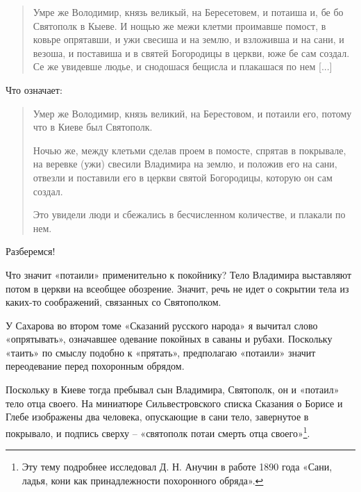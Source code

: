 \begin{quotation}
Умре же Володимир, князь великый, на Бересетовем, и потаиша и, бе бо Святополк в Кыеве. И нощью же межи клетми проимавше помост, в ковьре опрятавши, и ужи свесиша и на землю, и взложивша и на сани, и везоша, и поставиша и в святей Богородицы в церкви, юже бе сам создал. Се же увидевше людье, и снодошася бещисла и плакашася по нем [...]
\end{quotation}

Что означает:

\begin{quotation}
Умер же Володимир, князь великий, на Берестовом, и потаили его, потому что в Киеве был Святополк. 

Ночью же, между клетьми сделав проем в помосте, спрятав в покрывале, на веревке (ужи) свесили Владимира на землю, и положив его на сани, отвезли и поставили его в церкви святой Богородицы, которую он сам создал.

Это увидели люди и сбежались в бесчисленном количестве, и плакали по нем.
\end{quotation}

Разберемся!

Что значит «потаили» применительно к покойнику? Тело Владимира выставляют потом в церкви на всеобщее обозрение. Значит, речь не идет о сокрытии тела из каких-то соображений, связанных со Святополком. 

У Сахарова во втором томе «Сказаний русского народа» я вычитал слово «опрятывать», означавшее одевание покойных в саваны и рубахи. Поскольку «таить» по смыслу подобно к «прятать», предполагаю «потаили» значит переодевание перед похоронным обрядом.


Поскольку в Киеве тогда пребывал сын Владимира, Святополк, он и «потаил» тело отца своего. На миниатюре Сильвестровского списка Сказания о Борисе и Глебе изображены два человека, опускающие в сани тело, завернутое в покрывало, и подпись сверху – «святополк потаи смерть отца своего»\footnote{Эту тему подробнее исследовал Д. Н. Анучин в работе 1890 года «Сани, ладья, кони как принадлежности похоронного обряда».}. 


